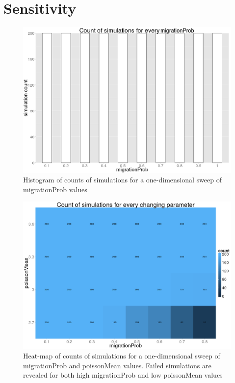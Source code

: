 \documentclass[a4paper,12pt]{report}
\begin{document}
\section{Sensitivity}
\begin{figure}[ht]
	\centering
	\includegraphics[scale=0.3]{../data/count-1d.png}
	\caption{Histogram of counts of simulations for a one-dimensional sweep of migrationProb values}
	\label{app:count-1d}
\end{figure}

\begin{figure}[ht]
	\centering
	\includegraphics[scale=0.3]{../data/count-2d.png}
	\caption{Heat-map of counts of simulations for a one-dimensional sweep of migrationProb and poissonMean values. Failed simulations are revealed for both high migrationProb and low poissonMean values}
	\label{app:count-2d}
\end{figure}
\end{document}
